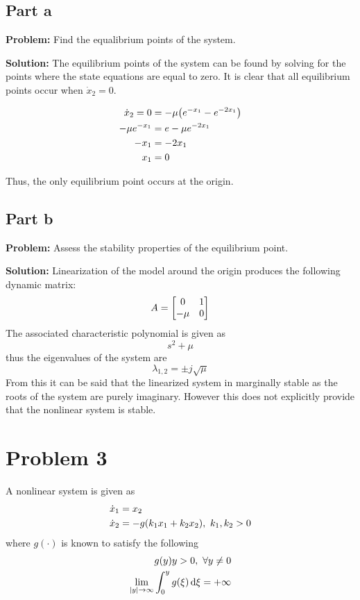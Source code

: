 \documentclass[letter]{article}
\begin{document}
\subsection{Part a}
\textbf{Problem:}
Find the equalibrium points of the system.

\noindent
\textbf{Solution:}
The equilibrium points of the system can be found by solving for the points where the state equations are equal to zero.
It is clear that all equilibrium points occur when $\dot{x}_2 = 0$.

\begin{align}
	\dot{x}_2 = 0 &= - \mu \qty(e^{-x_1} - e^{-2x_1})\\
	-\mu e^{-x_1} &= e -\mu e^{-2x_1}\\
	-x_1 &= -2x_1\\
	x_1 &= 0
\end{align}

Thus, the only equilibrium point occurs at the origin.

\subsection{Part b}
\textbf{Problem:}
Assess the stability properties of the equilibrium point.

\noindent
\textbf{Solution:}
Linearization of the model around the origin produces the following dynamic matrix:
\begin{equation}
	A = \mqty[	0 & 1\\
				-\mu & 0]
\end{equation}
The associated characteristic polynomial is given as $$s^2 + \mu$$ thus the eigenvalues of the system are $$\lambda_{1,2} = \pm j \sqrt{\mu}$$
From this it can be said that the linearized system in marginally stable as the roots of the system are purely imaginary. However this does not explicitly provide that the nonlinear system is stable.











\newpage
\section{Problem 3}
A nonlinear system is given as
\begin{equation}
	\begin{aligned}
		\dot{x}_1 &= x_2\\
		\dot{x}_2 &= -g \qty(k_1 x_1 + k_2 x_2), \ k_1, k_2 > 0
	\end{aligned}
\end{equation}
where $g(\cdot)$ is known to satisfy the following
\begin{equation}
	\begin{aligned}
		g(y) y > 0, \ \forall y \neq 0\\
		\lim_{\abs{y} \to \infty} \int_0^y g(\xi) \dd{\xi}  = + \infty
	\end{aligned}
\end{equation}
\end{document}
